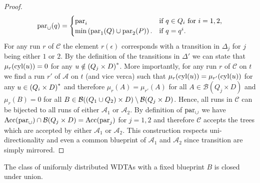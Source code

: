 \begin{proof}
\begin{equation*}
    \operatorname{par}_{\cup}(q) = \begin{cases}
      \operatorname{par}_{i}&\text{if }q\in Q_{i}\text{ for }i = 1,2,\\
      \min\left(\operatorname{par}_{1}(Q)\cup\operatorname{par}_{2}(P)\right).&\text{if }q = q^{i}.
    \end{cases}
  \end{equation*}
  For any run $r$ of $\mathcal{C}$ the element $r(\epsilon)$ corresponds with a
  transition in $\Delta_{j}$ for $j$ being either $1$ or $2$. By the definition
  of the transitions in $\Delta'$ we can state that $\mu_{r}(\operatorname{cyl}(u)) = 0$ for
  any $u\notin\left(Q_{j}\times D\right)^{*}$. More importantly, for any run $r$ of
  $\mathcal{C}$ on $t$ we find a run $r'$ of $\mathcal{A}$ on $t$ (and vice
  verca) such that $\mu_{r}(\operatorname{cyl}(u)) = \mu_{r'}(\operatorname{cyl}(u))$ for any 
  $u\in\left(Q_{i}\times D\right)^{*}$ and therefore $\mu_{r}(A) = \mu_{r'}(A)$ for
  all $A\in\mathcal{B}(Q_{j}\times D)$ and $\mu_{r}(B) = 0$ for all 
  $B\in\mathcal{B}(\left(Q_{1}\cup Q_{2}\right)\times D)
    \setminus\mathcal{B}(Q_{j}\times D)$. Hence, all runs in $\mathcal{C}$
  can be bijected to all runs of either $\mathcal{A}_{1}$ or $\mathcal{A}_{2}$.
  By definition of $\operatorname{par}_{\cup}$ we have 
  $\operatorname{Acc}(\operatorname{par}_{\cup})\cap\mathcal{B}(Q_{j}\times D) = \operatorname{Acc}(\operatorname{par}_{j})$ for
  $j = 1,2$ and therefore $\mathcal{C}$ accepts the trees which are accepted by 
  either $\mathcal{A}_{1}$ or $\mathcal{A}_{2}$. This construction respects 
  uni-directionality and even a common blueprint of $\mathcal{A}_{1}$ and 
  $\mathcal{A}_{2}$ since transition are simply mirrored.
\end{proof}

\begin{corollary}
  The class of uniformly distributed \acp{WDTA} with a fixed blueprint $B$ is 
  closed under union.
\end{corollary}


